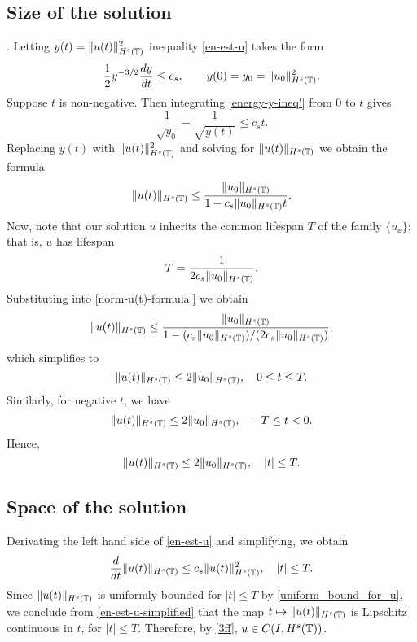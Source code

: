 	\subsection{ Size of the solution}. 
	Letting  $y(t)=  \|u(t)\|_{H^s(\mathbb{T})}^2$ inequality \eqref{en-est-u}
	takes the form
	\begin{equation} 
		\label{energy-y-ineq'}
		\frac 12
		y^{-3/2}\frac{dy}{dt}
		\le
		c_s,
		\qquad
		y(0)=y_0=  \|u_0\|_{H^s(\mathbb{T})}^2.
	\end{equation}
	Suppose $t$ is non-negative. Then integrating  \eqref{energy-y-ineq'}
	from  0 to $t$ gives
	\begin{equation*} 
		\frac{1}{\sqrt{y_0}}  - \frac{1}{\sqrt{y(t)}} 
		\le 
		c_s t.
	\end{equation*}
	Replacing $y(t)$ with   $\|u(t)\|_{H^s(\mathbb{T})}^2$  and solving for  $\|u(t)\|_{H^s(\mathbb{T})}$
	we obtain the formula
	\begin{equation} 
		\label{norm-u(t)-formula'}
		\|u(t)\|_{H^s(\mathbb{T})}
		\le
		\frac{ \|u_0\|_{H^s(\mathbb{T})}}{1-c_s\|u_0\|_{H^s(\mathbb{T})} t}.
	\end{equation}
	Now, note that our solution $u$ inherits the common lifespan $T$ of the family
	$\{u_\ee\}$; that is, $u$ has lifespan
	\begin{equation*}
		T
		=
		\frac{1}{2 c_s \|u_0\|_{H^s(\mathbb{T})}}.
	\end{equation*}
	Substituting into \eqref{norm-u(t)-formula'} we obtain	
	\begin{equation*} 
		\label{u(t)-u(0)-bound'}
		\|u(t)\|_{H^s(\mathbb{T})}
		\le
		\frac{ \|u_0\|_{H^s(\mathbb{T})}}{1-(c_s\|u_0\|_{H^s(\mathbb{T})})/(2 c_s \|u_0\|_{H^s(\mathbb{T})})},
	\end{equation*}
	which simplifies to 
	\begin{equation*}
		\|u(t)\|_{H^s(\mathbb{T})}
		\le
		2 \|u_0\|_{H^s(\mathbb{T})},
		\quad 
		0\le t \le T.
	\end{equation*}
	Similarly, for negative $t$, we have
	\begin{equation*}
		\|u(t)\|_{H^s(\mathbb{T})}
		\le
		2 \|u_0\|_{H^s(\mathbb{T})},
		\quad 
		-T \le t < 0.
	\end{equation*}
	Hence,
	\begin{equation}
		\label{uniform_bound_for_u}
		\|u(t)\|_{H^s(\mathbb{T})}
		\le
		2 \|u_0\|_{H^s(\mathbb{T})},
		\quad 
		|t| \le T.
	\end{equation}
		\subsection{Space of the solution}
	Derivating the left hand side of \eqref{en-est-u} and simplifying, we obtain
	\begin{equation}
		\label{en-est-u-simplified}
	\frac{d}{dt} \|u(t)\|_{H^s(\mathbb{T})} \le c_s \|u(t)\|_{H^s(\mathbb{T})}^2, \quad |t| \le T.
	\end{equation}
	Since $\|u(t)\|_{H^s(\mathbb{T})}$
	is uniformly bounded for $|t| \le T$ by
	\eqref{uniform_bound_for_u}, we conclude from
	\eqref{en-est-u-simplified} that the map $t \mapsto
	\|u(t)\|_{H^s(\mathbb{T})}$ is Lipschitz continuous in $t$, for $|t| \le T$.
	Therefore, by \eqref{3ff}, $u \in C(I, H^s(\mathbb{T}))$. 
